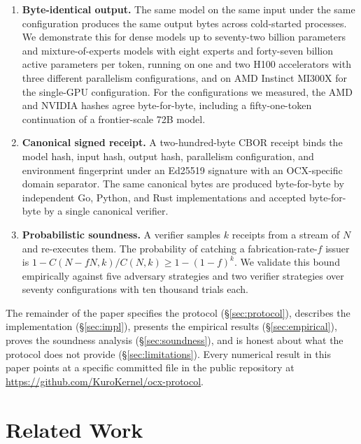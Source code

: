\documentclass[10pt]{article}
\begin{document}
\begin{enumerate}
\item \textbf{Byte-identical output.} The same model on the same input under the same configuration produces the same output bytes across cold-started processes. We demonstrate this for dense models up to seventy-two billion parameters and mixture-of-experts models with eight experts and forty-seven billion active parameters per token, running on one and two H100 accelerators with three different parallelism configurations, and on AMD Instinct MI300X for the single-GPU configuration. For the configurations we measured, the AMD and NVIDIA hashes agree byte-for-byte, including a fifty-one-token continuation of a frontier-scale 72B model.
\item \textbf{Canonical signed receipt.} A two-hundred-byte CBOR receipt binds the model hash, input hash, output hash, parallelism configuration, and environment fingerprint under an Ed25519 signature with an OCX-specific domain separator. The same canonical bytes are produced byte-for-byte by independent Go, Python, and Rust implementations and accepted byte-for-byte by a single canonical verifier.
\item \textbf{Probabilistic soundness.} A verifier samples $k$ receipts from a stream of $N$ and re-executes them. The probability of catching a fabrication-rate-$f$ issuer is $1 - C(N - fN, k) / C(N, k) \geq 1 - (1-f)^k$. We validate this bound empirically against five adversary strategies and two verifier strategies over seventy configurations with ten thousand trials each.
\end{enumerate}

The remainder of the paper specifies the protocol (\S\ref{sec:protocol}), describes the implementation (\S\ref{sec:impl}), presents the empirical results (\S\ref{sec:empirical}), proves the soundness analysis (\S\ref{sec:soundness}), and is honest about what the protocol does not provide (\S\ref{sec:limitations}). Every numerical result in this paper points at a specific committed file in the public repository at \url{https://github.com/KuroKernel/ocx-protocol}.

\section{Related Work}
\label{sec:related}
\end{document}

